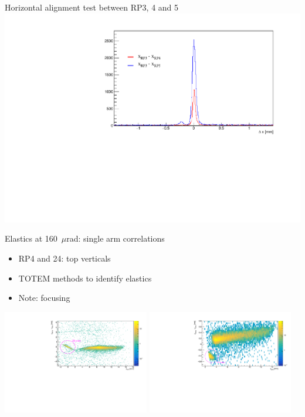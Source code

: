 \documentclass{beamer}
\begin{document}
\begin{frame}\scriptsize
	\begin{block}{Horizontal alignment test between RP3, 4 and 5}
             \includegraphics[width=1.0\textwidth]{x_alignment_160_murad.pdf}
	\end{block}
	
\end{frame}

\begin{frame}\scriptsize
	\begin{block}{Elastics at 160~$\mu$rad: single arm correlations}
    		\begin{itemize}
			\item RP4 and 24: top verticals
			\item TOTEM methods to identify elastics
			\item Note: focusing
		\end{itemize}
	\begin{center}
             \includegraphics[width=0.48\textwidth]{160_murad_x_elastics.pdf}
             \includegraphics[width=0.48\textwidth]{160_murad_y_elastics.pdf}\\
	\end{center}
	\end{block}
	
\end{frame}
\end{document}
